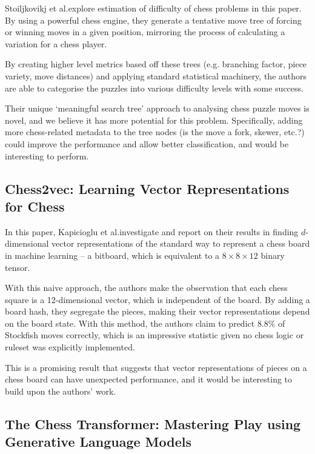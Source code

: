 Stoiljkovikj et al.\@ explore estimation of difficulty of chess problems in
this paper.\cite{chessTrees} By using a powerful chess engine, they generate a
tentative move tree of forcing or winning moves in a given position, mirroring
the process of calculating a variation for a chess player. 

By creating higher level metrics based off these trees (e.g. branching factor,
piece variety, move distances) and applying standard statistical machinery, the
authors are able to categorise the puzzles into various difficulty levels with
some success.

Their unique `meaningful search tree'\cite{chessTrees} approach to analysing
chess puzzle moves is novel, and we believe it has more potential for this
problem. Specifically, adding more chess-related metadata to the tree nodes (is
the move a fork, skewer, etc.?\@) could improve the performance and allow
better classification, and would be interesting to perform.

\subsection{Chess2vec: Learning Vector Representations for Chess}

In this paper, Kapicioglu et al.\@ investigate and report on their results in
finding $d$-dimensional vector representations of the standard way to represent
a chess board in machine learning -- a bitboard,\cite{chess2vec} which is
equivalent to a $8\times8\times12$ binary tensor. 

With this naive approach, the authors make the observation that each chess
square is a 12-dimensional vector, which is independent of the board. By adding
a board hash, they segregate the pieces, making their vector representations
depend on the board state. With this method, the authors claim to predict
$8.8\%$ of Stockfish moves correctly,\cite{chess2vec} which is an impressive
statistic given no chess logic or ruleset was explicitly implemented.

This is a promising result that suggests that vector representations of pieces
on a chess board can have unexpected performance, and it would be interesting
to build upon the authors' work.

\subsection{The Chess Transformer: Mastering Play using Generative Language Models}

